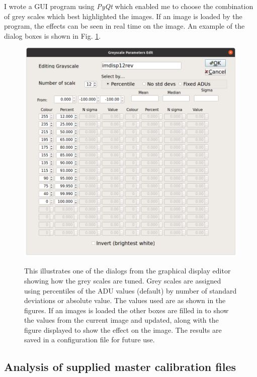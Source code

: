 I wrote a GUI program using \textit{PyQt} which enabled me to choose the
combination of grey scales which best highlighted the images. If an image is
loaded by the program, the effects can be seen in real time on the image. An
example of the dialog boxes is shown in Fig. \ref{fig:geditorshot}.

\begin{figure}[!htbp]
\begin{center}
\includegraphics[scale=0.4]{images/geditorshot.png}
\end{center}   
\caption{This illustrates one of the dialogs from the graphical display editor
showing how the grey scales are tuned. Grey scales are assigned using
percentiles of the ADU values (default) by number of standard deviations or
absolute value. The values used are as shown in the figures. If an images is
loaded the other boxes are filled in to show the values from the current image
and updated, along with the figure displayed to show the effect on the image.
The results are saved in a configuration file for future use.}
\protect\label{fig:geditorshot}
\end{figure}

\subsection{Analysis of supplied master calibration files}
\protect\label{section:masterbiasflat}

